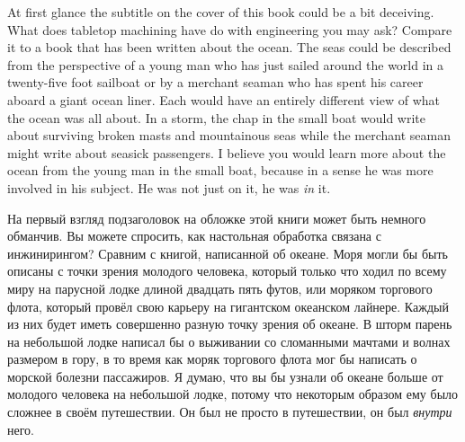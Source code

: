 
\secdown

\secdown


\begin{enen}
At first glance the subtitle on the cover of this book could be a bit deceiving.
What does tabletop machining have do with engineering you may ask? Compare it to
a book that has been written about the ocean. The seas could be described from
the perspective of a young man who has just sailed around the world in a
twenty-five foot sailboat or by a merchant seaman who has spent his career
aboard a giant ocean liner. Each would have an entirely different view of what
the ocean was all about. In a storm, the chap in the small boat would write
about surviving broken masts and mountainous seas while the merchant seaman
might write about seasick passengers. I believe you would learn more about the
ocean from the young man in the small boat, because in a sense he was more
involved in his subject. He was not just on it, he was \textit{in} it.
\end{enen}

\begin{ruru}
На первый взгляд подзаголовок на обложке этой книги может быть немного обманчив.
Вы можете спросить, как настольная обработка связана с инжинирингом? Сравним с
книгой, написанной об океане. Моря могли бы быть описаны с точки зрения молодого
человека, который только что ходил по всему миру на парусной лодке длиной
двадцать пять футов, или моряком торгового флота, который провёл свою карьеру на
гигантском океанском лайнере. Каждый из них будет иметь совершенно разную точку
зрения об океане. В шторм парень на небольшой лодке написал бы о выживании со
сломанными мачтами и волнах размером в гору, в то время как моряк торгового
флота мог бы написать о морской болезни пассажиров. Я думаю, что вы бы узнали об
океане больше от молодого человека на небольшой лодке, потому что некоторым
образом ему было сложнее в своём путешествии. Он был не просто в путешествии, он
был \textit{внутри} него.
\end{ruru}


